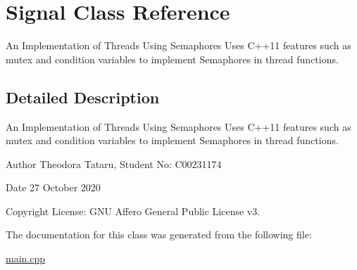 \hypertarget{class_signal}{}\section{Signal Class Reference}
\label{class_signal}


An Implementation of Threads Using Semaphores Uses C++11 features such as mutex and condition variables to implement Semaphores in thread functions.  




\subsection{Detailed Description}
An Implementation of Threads Using Semaphores Uses C++11 features such as mutex and condition variables to implement Semaphores in thread functions. 

\begin{DoxyAuthor}{Author}
Theodora Tataru, Student No\+: C00231174~\newline
 
\end{DoxyAuthor}
\begin{DoxyDate}{Date}
27 October 2020 
\end{DoxyDate}
\begin{DoxyCopyright}{Copyright}
License\+: G\+NU Affero General Public License v3. 
\end{DoxyCopyright}


The documentation for this class was generated from the following file\+:\begin{DoxyCompactItemize}
\item 
\hyperlink{main_8cpp}{main.\+cpp}\end{DoxyCompactItemize}
